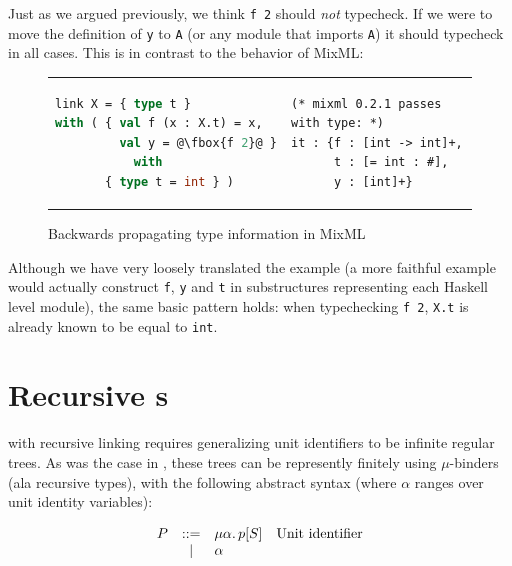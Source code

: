 Just as we argued previously, we think \verb|f 2| should \emph{not}
typecheck.  If we were to move the definition of \verb|y| to \verb|A|
(or any module that imports \verb|A|) it should typecheck in all cases.
This is in contrast to the behavior of MixML\@:

\begin{figure}[H]
\begin{tabular}{p{} p{}}
\begin{lstlisting}[language=ML,escapechar=@]
link X = { type t }
with ( { val f (x : X.t) = x,
         val y = @\fbox{f 2}@ }
           with
       { type t = int } )
\end{lstlisting}
&
\begin{verbatim}
(* mixml 0.2.1 passes with type: *)
it : {f : [int -> int]+,
      t : [= int : #],
      y : [int]+}
\end{verbatim}
\end{tabular}
\caption{Backwards propagating type information in MixML}
\label{fig:double-vision-backwards-propagating-mixml}
\end{figure}

\noindent
Although we have very loosely translated the example (a more
faithful example would actually construct \verb|f|, \verb|y| and
\verb|t| in substructures representing each Haskell level
module), the same basic pattern holds: when typechecking \verb|f 2|,
\verb|X.t| is already known to be equal to \verb|int|.

\section{Recursive \uid{}s}
\label{sec:recursive-uids}


\Backpack{} with recursive linking requires generalizing unit
identifiers to be infinite regular trees.  As was the case
in \OldBackpack{}, these trees can be
represently finitely using $\mu$-binders (ala recursive types),
with the following abstract syntax (where $\alpha$ ranges over
unit identity variables):

\[
\begin{array}{rcll}
  \UP &::=& \mu\alpha.\, \icid{\Up}{S} & \text{\Uid} \\
      & | & \alpha \\
\end{array}
\]

